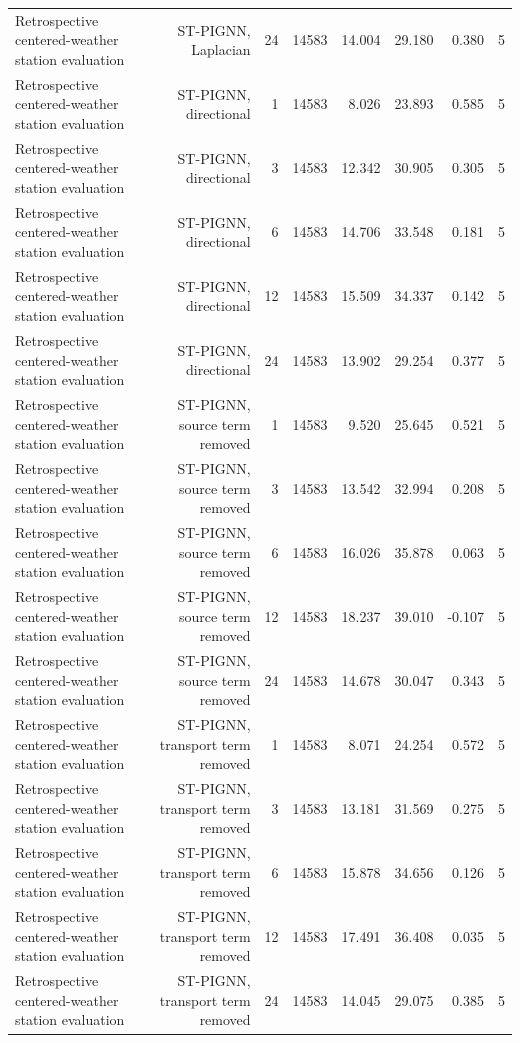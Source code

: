 \begin{table}[t]
\begin{tabular}{lrrrrrrr}
Retrospective centered-weather station evaluation & ST-PIGNN, Laplacian & 24 & 14583 & 14.004 & 29.180 & 0.380 & 5 \\
Retrospective centered-weather station evaluation & ST-PIGNN, directional & 1 & 14583 & 8.026 & 23.893 & 0.585 & 5 \\
Retrospective centered-weather station evaluation & ST-PIGNN, directional & 3 & 14583 & 12.342 & 30.905 & 0.305 & 5 \\
Retrospective centered-weather station evaluation & ST-PIGNN, directional & 6 & 14583 & 14.706 & 33.548 & 0.181 & 5 \\
Retrospective centered-weather station evaluation & ST-PIGNN, directional & 12 & 14583 & 15.509 & 34.337 & 0.142 & 5 \\
Retrospective centered-weather station evaluation & ST-PIGNN, directional & 24 & 14583 & 13.902 & 29.254 & 0.377 & 5 \\
Retrospective centered-weather station evaluation & ST-PIGNN, source term removed & 1 & 14583 & 9.520 & 25.645 & 0.521 & 5 \\
Retrospective centered-weather station evaluation & ST-PIGNN, source term removed & 3 & 14583 & 13.542 & 32.994 & 0.208 & 5 \\
Retrospective centered-weather station evaluation & ST-PIGNN, source term removed & 6 & 14583 & 16.026 & 35.878 & 0.063 & 5 \\
Retrospective centered-weather station evaluation & ST-PIGNN, source term removed & 12 & 14583 & 18.237 & 39.010 & -0.107 & 5 \\
Retrospective centered-weather station evaluation & ST-PIGNN, source term removed & 24 & 14583 & 14.678 & 30.047 & 0.343 & 5 \\
Retrospective centered-weather station evaluation & ST-PIGNN, transport term removed & 1 & 14583 & 8.071 & 24.254 & 0.572 & 5 \\
Retrospective centered-weather station evaluation & ST-PIGNN, transport term removed & 3 & 14583 & 13.181 & 31.569 & 0.275 & 5 \\
Retrospective centered-weather station evaluation & ST-PIGNN, transport term removed & 6 & 14583 & 15.878 & 34.656 & 0.126 & 5 \\
Retrospective centered-weather station evaluation & ST-PIGNN, transport term removed & 12 & 14583 & 17.491 & 36.408 & 0.035 & 5 \\
Retrospective centered-weather station evaluation & ST-PIGNN, transport term removed & 24 & 14583 & 14.045 & 29.075 & 0.385 & 5 \\

\end{tabular}
\end{table}
